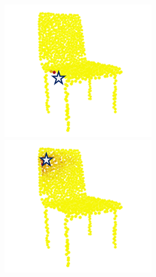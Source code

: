 \documentclass[letterpaper]{article}
\begin{document}
\begin{figure}[htbp]
\begin{center}
\begin{minipage}[b]{0.8\linewidth}
\begin{center}
\begin{minipage}[b]{0.12\linewidth}
\begin{center}
\end{center}
\end{minipage}
\begin{minipage}[b]{0.12\linewidth}
\begin{center}
\includegraphics[width=1.0\linewidth]{images/atten_pic/dgcnn_chair_feature_2.png}
\end{center}
\end{minipage}
\begin{minipage}[b]{0.12\linewidth}
\begin{center}
\includegraphics[width=1.0\linewidth]{images/atten_pic/dgcnn_chair_feature_3.png}

\end{center}
\end{minipage}
\end{center}
\end{minipage}
\end{center}
\end{figure}
\end{document}
